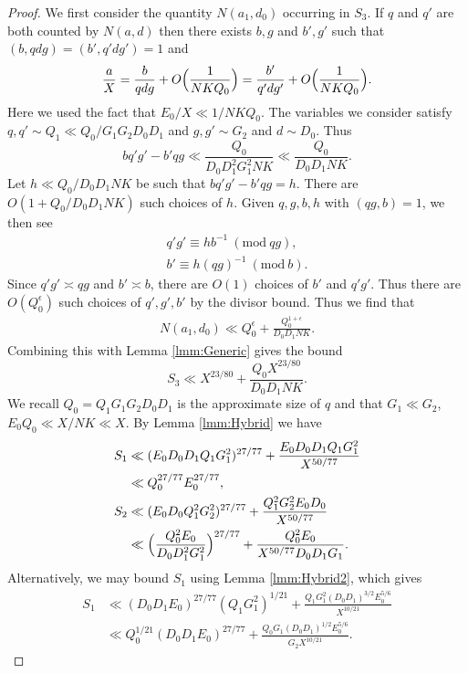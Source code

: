 \documentclass[10pt]{amsart}
\theoremstyle{plain}
\numberwithin{sblmm}{thrm}
\numberwithin{equation}{section}
\newcommand{\Mod}[1]{\ (\mathrm{mod}\ #1)}
\begin{document}
\begin{proof}
We first consider the quantity $N(a_1,d_0)$ occurring in $S_3$. If $q$ and $q'$ are both counted by $N(a,d)$ then there exists $b,g$ and $b',g'$ such that $(b,q d g)=(b',q' d g')=1$ and
\[
\frac{a}{X}=\frac{b}{q d g}+O\Bigl(\frac{1}{N K Q_0}\Bigr)=\frac{b'}{q' d g'}+O\Bigl(\frac{1}{N K Q_0}\Bigr).
\]
Here we used the fact that $E_0/X\ll 1/N K Q_0$. The variables we consider satisfy $q,q'\sim Q_1\ll Q_0/G_1G_2D_0D_1$ and $g,g'\sim G_2$ and $d\sim D_0$. Thus
\[
b q' g'-b' q g\ll \frac{Q_0}{D_0D_1^2G_1^2 N K} \ll \frac{Q_0}{D_0 D_1 N K}.
\]
Let $h\ll Q_0 / D_0 D_1 N K$ be such that $b q' g'-b' q g=h$. There are $O(1+Q_0/D_0D_1 N K)$ such choices of $h$. Given $q,g,b,h$ with $(q g,b)=1$, we then see 
\begin{align*}
 q' g'\equiv h b^{-1} \Mod{q g},\\
b'\equiv h(q g)^{-1}\Mod{b}.
\end{align*}
Since $q' g'\asymp q g$ and $b'\asymp b$, there are $O(1)$ choices of $b'$ and $q' g'$. Thus there are $O(Q_0^\epsilon)$ such choices of $q',g',b'$ by the divisor bound. Thus we find that
\begin{align*}
N(a_1,d_0)\ll Q_0^\epsilon+\frac{Q_0^{1+\epsilon}}{D_0D_1N K}.
\end{align*}
Combining this with Lemma \ref{lmm:Generic} gives the bound
%
\begin{equation}
S_3\ll X^{23/80}+\frac{Q_0 X^{23/80}}{D_0D_1N K}.\label{eq:S3Bound}
\end{equation}
%
We recall $Q_0=Q_1G_1G_2D_0D_1$ is the approximate size of $q$ and that $G_1\ll G_2$, $E_0Q_0\ll X/N K\ll X$. By Lemma \ref{lmm:Hybrid} we have
%
\begin{align}
S_1&\ll (E_0 D_0 D_1 Q_1 G_1^2)^{27/77}+\frac{E_0 D_0 D_1 Q_1 G_1^2}{X^{50/77}}\nonumber\\
&\ll  Q_0^{27/77} E_0^{27/77},\label{eq:S2Bound1}\\
S_2&\ll (E_0 D_0 Q_1^2G_2^2)^{27/77}+\frac{Q_1^2 G_2^2 E_0 D_0}{X^{50/77}}\nonumber\\
&\ll \Bigl(\frac{ Q_0^{2} E_0}{D_0 D_1^{2} G_1^{2}}\Bigr)^{27/77}+\frac{Q_0^2 E_0}{X^{50/77} D_0 D_1 G_1}.\label{eq:S1Bound}
\end{align}
%
Alternatively, we may bound $S_1$ using Lemma \ref{lmm:Hybrid2}, which gives
%
\begin{align}
S_1&\ll (D_0 D_1 E_0)^{27/77}(Q_1G_1^2)^{1/21}+\frac{Q_1 G_1^2 (D_0 D_1)^{3/2} E_0^{5/6}}{X^{10/21}}\nonumber\\
&\ll Q_0^{1/21} (D_0 D_1 E_0)^{27/77} + \frac{Q_0 G_1 (D_0 D_1)^{1/2} E_0^{5/6}}{G_2 X^{10/21}}.\label{eq:S2Bound2}

\end{align}
\end{proof}
\end{document}
